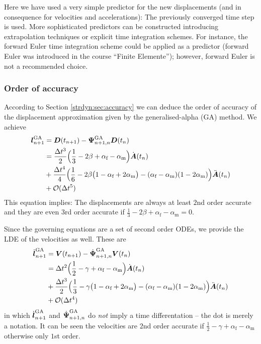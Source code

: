 Here we have used a very simple predictor for the new displacements (and in
consequence for velocities and accelerations): The previously converged time
step is used.  More sophisticated
predictors can be constructed introducing extrapolation techniques or
explicit time integration schemes. For instance, the forward
Euler time integration scheme could be applied as a predictor (forward Euler
was introduced in the course ``Finite Elemente''); however, forward Euler is
not a recommended choice.

\subsubsection{Order of accuracy}
According to Section \ref{strdyn:sec:accuracy} we can deduce the order of accuracy of the displacement approximation given by the generalised-alpha (GA) method. We achieve
\begin{align}
   \boldsymbol{l}_{n+1}^{\text{GA}}
&  = \boldsymbol{D}(t_{n+1}) - \boldsymbol{\Psi}_{n+1,n}^{\text{GA}} \boldsymbol{D}(t_n)
\\
&  = \frac{\Delta t^3}{2} \Big( \frac{1}{3} - 2\beta + \alpha_\text{f} - \alpha_\text{m}\Big) 
   \dot{\boldsymbol{A}}(t_n)
\\
&  + \frac{\Delta t^4}{4} \Big( \frac{1}{6} - 2\beta\big(1-\alpha_\text{f}+2\alpha_\text{m}\big) - (\alpha_\text{f}-\alpha_\text{m})(1-2\alpha_\text{m}) \Big)  
   \ddot{\boldsymbol{A}}(t_n) 
\\
&   + \mathcal{O}(\Delta t^5)
\end{align}
This equation implies: The displacements are always at least $2$nd order accurate and they are even $3$rd order accurate if $\frac{1}{3} - 2\beta + \alpha_\text{f} - \alpha_\text{m} = 0$. 

Since the governing equations are a set of second order ODEs, we provide the LDE of the velocities as well. These are
\begin{align}
   \dot{\boldsymbol{l}}_{n+1}^{\text{GA}}
&  = \boldsymbol{V}(t_{n+1}) - \dot{\boldsymbol{\Psi}}_{n+1,n}^{\text{GA}} \boldsymbol{V}(t_n)
\\
&  = \Delta t^2 \Big( \frac{1}{2} - \gamma + \alpha_\text{f} - \alpha_\text{m} \Big) 
   \dot{\boldsymbol{A}}(t_n)
\\
&  + \frac{\Delta t^3}{2} \Big( \frac{1}{3} - \gamma\big(1-\alpha_\text{f}+2\alpha_\text{m}\big) - (\alpha_\text{f}-\alpha_\text{m})(1-2\alpha_\text{m}) \Big)  
   \ddot{\boldsymbol{A}}(t_n) 
\\
&   + \mathcal{O}(\Delta t^4)
\end{align}
in which $\dot{\boldsymbol{l}}_{n+1}^{\text{GA}}$ and $\dot{\boldsymbol{\Psi}}_{n+1,n}^{\text{GA}}$ do \emph{not} imply a time differentation -- the dot is merely a notation. It can be seen the velocities are $2$nd order accurate if $\frac{1}{2} - \gamma + \alpha_\text{f} - \alpha_\text{m}$ otherwise only $1$st order.

